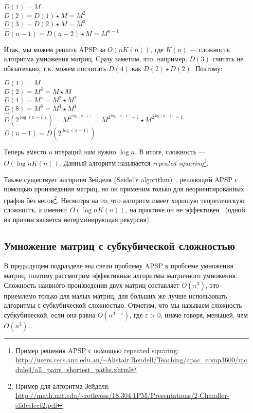 \begin{center}
    $D(1) = M$ \\
    $D(2) = D(1) \star M = M^2$ \\
    $D(3) = D(2) \star M = M^3$ \\
    $\dots$ \\
    $D(n-1) = D(n-2) \star M = M^{n-1}$ \\
\end{center}

Итак, мы можем решить APSP за $O(n K(n))$, где $K(n)$ --- сложность алгоритма умножения матриц.
Сразу заметим, что, например, $D(3)$ считать не обязательно, т.к. можем посчитать $D(4)$ как $D(2) \star D(2)$.
Поэтому:

\begin{center}
    $D(1) = M$ \\
    $D(2) = M^2 = M \star M$ \\
    $D(4) = M^4 = M^2 \star M^2$ \\
    $D(8) = M^8 = M^4 \star M^4$ \\
    $\dots$ \\
    $D(2^{\log(n-1)}) = M^{2^{\log(n-1)}} = M^{2^{\log(n-1)} - 1} \star M^{2^{\log(n-1)} - 1}$ \\
    $D(n-1) = D(2^{\log(n-1)})$ \\
\end{center}

Теперь вместо $n$ итераций нам нужно $\log{n}$. В итоге, сложность --- $O(\log{n} K(n))$.
Данный алгоритм называется \textit{repeated squaring}\footnote{Пример решения APSP с помощью repeated squaring: \url{http://users.cecs.anu.edu.au/~Alistair.Rendell/Teaching/apac_comp3600/module4/all_pairs_shortest_paths.xhtml}}.

\begin{remark}
Также существует алгоритм Зейделя (Seidel's algorithm)~\cite{Seidel1995}, решающий APSP с помощью произведения матриц, но он применим только для неориентированных графов без весов\footnote{Пример для алгоритма Зейделя: \url{http://math.mit.edu/~rothvoss/18.304.1PM/Presentations/2-Chandler-slideslect2.pdf}}.
Несмотря на то, что алгоритм имеет хорошую теоретическую сложность, а именно: $O(\log n K(n))$, на практике он не эффективен~\cite{Lavallee2004} (одной из причин является нетерминирующая рекурсия).
\end{remark}

\subsection{Умножение матриц с субкубической сложностью}
В предыдущем подразделе мы свели проблему APSP к проблеме умножения матриц, поэтому рассмотрим эффективные алгоритмы матричного умножения.
Сложность наивного произведения двух матриц составляет $O(n^3)$, это приемлемо только для малых матриц, для больших же лучше использовать алгоритмы с субкубической сложностью. Отметим, что мы называем сложность субкубической, если она равна $O(n^{3-\varepsilon})$, где $\varepsilon > 0$, иначе говоря, меньшей, чем $O(n^3)$.

